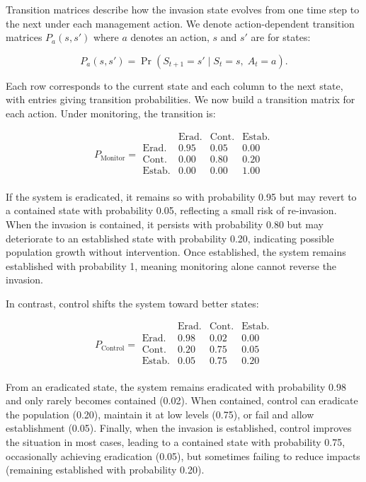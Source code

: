 \documentclass[
  11pt,
  a4paper,
]{article}
\begin{document}
Transition matrices describe how the invasion state evolves from one time step to the next under each management action. We denote action-dependent transition matrices \(P_a(s,s')\) where \(a\) denotes an action, \(s\) and \(s'\) are for states:

\[
P_a(s,s') = \Pr(S_{t+1}=s' \mid S_t=s,\; A_t=a).
\]

Each row corresponds to the current state and each column to the next state, with entries giving transition probabilities. We now build a transition matrix for each action. Under monitoring, the transition is:

\[
P_{\text{Monitor}} =
\begin{array}{c|ccc}
 & \text{Erad.} & \text{Cont.} & \text{Estab.} \\
\hline
\text{Erad.} & 0.95 & 0.05 & 0.00 \\
\text{Cont.} & 0.00 & 0.80 & 0.20 \\
\text{Estab.} & 0.00 & 0.00 & 1.00 \\
\end{array}
\]

If the system is eradicated, it remains so with probability 0.95 but may revert to a contained state with probability 0.05, reflecting a small risk of re-invasion. When the invasion is contained, it persists with probability 0.80 but may deteriorate to an established state with probability 0.20, indicating possible population growth without intervention. Once established, the system remains established with probability 1, meaning monitoring alone cannot reverse the invasion.

In contrast, control shifts the system toward better states:

\[
P_{\text{Control}} =
\begin{array}{c|ccc}
 & \text{Erad.} & \text{Cont.} & \text{Estab.} \\
\hline
\text{Erad.} & 0.98 & 0.02 & 0.00 \\
\text{Cont.} & 0.20 & 0.75 & 0.05 \\
\text{Estab.} & 0.05 & 0.75 & 0.20 \\
\end{array}
\]

From an eradicated state, the system remains eradicated with probability 0.98 and only rarely becomes contained (0.02). When contained, control can eradicate the population (0.20), maintain it at low levels (0.75), or fail and allow establishment (0.05). Finally, when the invasion is established, control improves the situation in most cases, leading to a contained state with probability 0.75, occasionally achieving eradication (0.05), but sometimes failing to reduce impacts (remaining established with probability 0.20).
\end{document}
